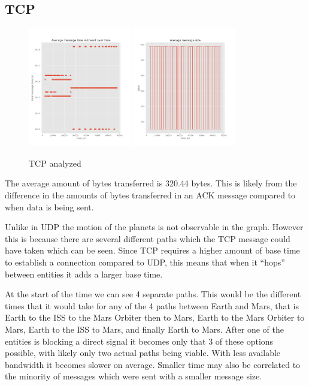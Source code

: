\documentclass[a4paper,12pt]{article}
\begin{document}
\subsection{TCP}

\begin{figure}[h]
  \centering
  \includegraphics[width=0.4\textwidth]{media/tcp.png}
  \includegraphics[width=0.4\textwidth]{media/tcp_data.png}
  \caption{TCP analyzed}
\end{figure}

The average amount of bytes transferred is 320.44 bytes. This is likely from the
difference in the amounts of bytes transferred in an ACK message compared to
when data is being sent.

Unlike in UDP the motion of the planets is not observable in the graph. However
this is because there are several different paths which the TCP message could
have taken which can be seen. Since TCP requires a higher amount of base time to
establish a connection compared to UDP, this means that when it ``hops'' between
entities it adds a larger base time.

At the start of the time we can see 4 separate paths. This would be the
different times that it would take for any of the 4 paths between Earth and
Mars, that is Earth to the ISS to the Mars Orbiter then to Mars, Earth to the
Mars Orbiter to Mars, Earth to the ISS to Mars, and finally Earth to Mars. After
one of the entities is blocking a direct signal it becomes only that 3 of these
options possible, with likely only two actual paths being viable. With less
available bandwidth it becomes slower on average. Smaller time may also be
correlated to the minority of messages which were sent with a smaller message
size.
\end{document}
